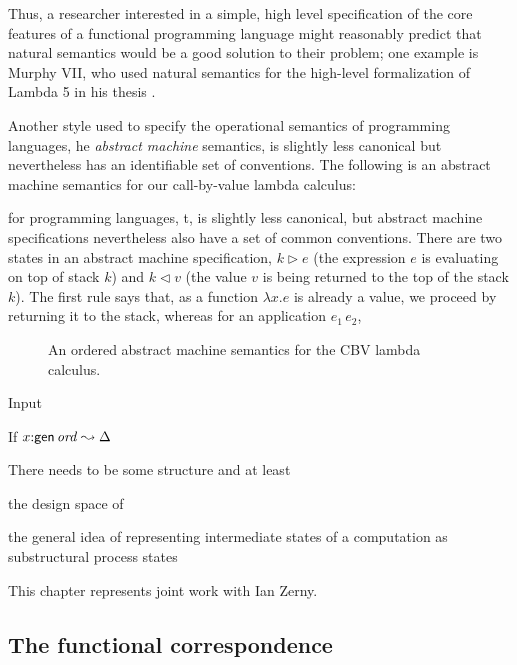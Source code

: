 Thus, a researcher interested in a simple, high level specification of
the core features of a functional programming language might
reasonably predict that natural semantics would be a good solution to
their problem; one example is Murphy VII, who used natural semantics
for the high-level formalization of Lambda 5 in his thesis
\cite{murphy08modal}.

Another style used to specify the operational semantics of programming
languages, he {\it abstract
  machine} semantics, is slightly less canonical but nevertheless has
an identifiable set of conventions. The following is an abstract 
machine semantics for our call-by-value lambda calculus:


 for programming languages, t, is slightly less canonical, but abstract machine
specifications nevertheless also have a set of common
conventions. There are two states in an abstract machine
specification, $k \rhd e$ (the expression $e$ is evaluating on top of
stack $k$) and $k \lhd v$ (the value $v$ is being returned to the top
of the stack $k$). The first rule says that, as a function $\lambda x.e$
is already a value, we proceed by returning it to the stack, whereas
for an application $e_1\,e_2$, 

\begin{figure}
\caption{An ordered abstract machine semantics for the CBV lambda calculus.}
\end{figure}

Input


\begin{theorem}
If $x{:}{\sf gen}\,{{\it ord}} \leadsto \Delta$
\end{theorem}

There needs to be some structure and
at least


the design space
of 

 the general idea
of representing intermediate states of a computation as 
substructural process states 

This chapter represents joint work with Ian Zerny.


\subsection{The functional correspondence}


